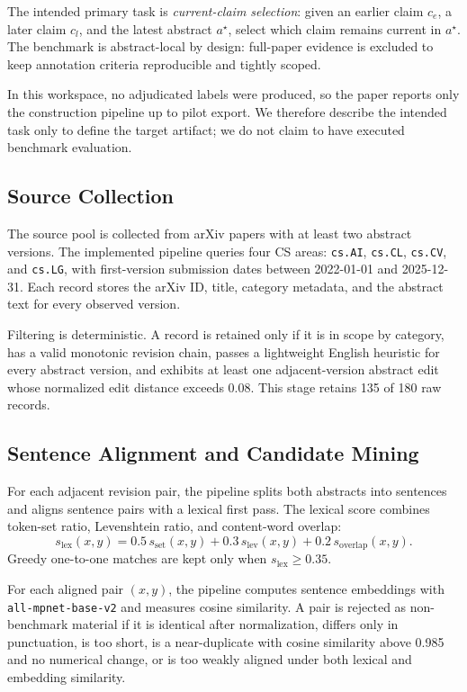\documentclass{article}
\begin{document}
The intended primary task is \emph{current-claim selection}: given an earlier claim $c_e$, a later claim $c_l$, and the latest abstract $a^\star$, select which claim remains current in $a^\star$. The benchmark is abstract-local by design: full-paper evidence is excluded to keep annotation criteria reproducible and tightly scoped.

In this workspace, no adjudicated labels were produced, so the paper reports only the construction pipeline up to pilot export. We therefore describe the intended task only to define the target artifact; we do not claim to have executed benchmark evaluation.

\subsection{Source Collection}

The source pool is collected from arXiv papers with at least two abstract versions. The implemented pipeline queries four CS areas: \texttt{cs.AI}, \texttt{cs.CL}, \texttt{cs.CV}, and \texttt{cs.LG}, with first-version submission dates between 2022-01-01 and 2025-12-31. Each record stores the arXiv ID, title, category metadata, and the abstract text for every observed version.

Filtering is deterministic. A record is retained only if it is in scope by category, has a valid monotonic revision chain, passes a lightweight English heuristic for every abstract version, and exhibits at least one adjacent-version abstract edit whose normalized edit distance exceeds 0.08. This stage retains 135 of 180 raw records.

\subsection{Sentence Alignment and Candidate Mining}

For each adjacent revision pair, the pipeline splits both abstracts into sentences and aligns sentence pairs with a lexical first pass. The lexical score combines token-set ratio, Levenshtein ratio, and content-word overlap:
\[
s_{\mathrm{lex}}(x,y) = 0.5\, s_{\mathrm{set}}(x,y) + 0.3\, s_{\mathrm{lev}}(x,y) + 0.2\, s_{\mathrm{overlap}}(x,y).
\]
Greedy one-to-one matches are kept only when $s_{\mathrm{lex}} \geq 0.35$.

For each aligned pair $(x,y)$, the pipeline computes sentence embeddings with \texttt{all-mpnet-base-v2} and measures cosine similarity. A pair is rejected as non-benchmark material if it is identical after normalization, differs only in punctuation, is too short, is a near-duplicate with cosine similarity above 0.985 and no numerical change, or is too weakly aligned under both lexical and embedding similarity.
\end{document}
